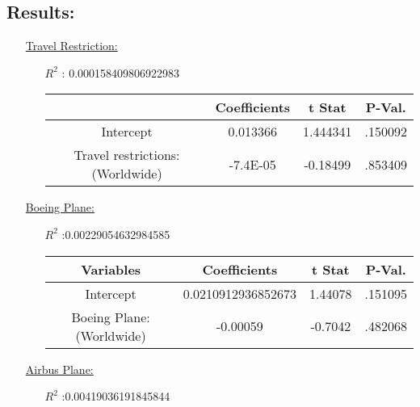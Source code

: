 \documentclass[12pt]{report}
\begin{document}
\subsection*{Results:}
\begin{enumerate}
    \item[\underline{Travel Restriction:}]
        \begin{enumerate}
            \item[$R^2$]: 0.000158409806922983
            \item[]
                \begin{tabular}{|c|c|c|c|}
                    \toprule \hline
                    \textbf{} & \textbf{Coefficients}  & \textbf{t Stat}&\textbf{P-Val.} \\ \hline

                    Intercept & 0.013366 &  1.444341 & .150092\\ \hline
                    Travel restrictions:(Worldwide) & -7.4E-05 &  -0.18499 &.853409 \\ \hline
                    \bottomrule
                \end{tabular}





        \end{enumerate}
    \item[\underline{Boeing Plane:}]
        \begin{enumerate}
            \item[$R^2$]:0.00229054632984585
            \item[]

                \begin{tabular}{|c|c|c|c|}
                    \toprule \hline
                    \textbf{Variables} & \textbf{Coefficients}  & \textbf{t Stat}&\textbf{P-Val.} \\ \hline
                    Intercept &0.0210912936852673 &  1.44078 &.151095 \\ \hline
                    Boeing Plane: (Worldwide) & -0.00059  & -0.7042 &.482068 \\ \hline
                    \bottomrule
                \end{tabular}




        \end{enumerate}
    \item[\underline{Airbus Plane:}]
        \begin{enumerate}
            \item[$R^2$]:0.00419036191845844
            \item[]


\end{enumerate}
\end{enumerate}
\end{document}
